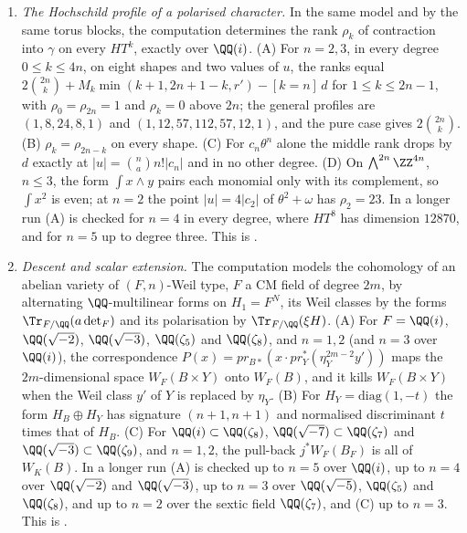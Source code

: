 \begin{enumerate}[label=\textup{(\Roman*)},leftmargin=*]
\item \emph{The Hochschild profile of a polarised character.} In the same
  model and by the same torus blocks, the computation determines the rank
  $\rho_{k}$ of contraction into $\gamma$ on every $HT^{k}$, exactly over
  $\QQ(i)$. (A) For $n=2,3$, in every degree $0\le k\le4n$, on eight shapes and two values of $u$, the ranks equal
  $2\binom{2n}{k}+M_{k}\min(k+1,2n+1-k,r')-[k=n]\,d$ for $1\le k\le2n-1$, with
  $\rho_{0}=\rho_{2n}=1$ and $\rho_{k}=0$ above $2n$; the general profiles are
  $(1,8,24,8,1)$ and $(1,12,57,112,57,12,1)$, and the pure case gives
  $2\binom{2n}{k}$. (B) $\rho_{k}=\rho_{2n-k}$ on every shape. (C) For
  $c_{n}\theta^{n}$ alone the middle rank drops by $d$ exactly at
  $|u|=\binom{n}{a}n!|c_{n}|$ and in no other degree. (D) On
  $\bigwedge^{2n}\ZZ^{4n}$, $n\le3$, the form $\int x\wedge y$ pairs each
  monomial only with its complement, so $\int x^{2}$ is even; at $n=2$ the
  point $|u|=4|c_{2}|$ of $\theta^{2}+\omega$ has $\rho_{2}=23$. In a longer
  run (A) is checked for $n=4$ in every degree, where $HT^{8}$ has
  dimension $12870$, and for $n=5$ up to degree three. This is
  .

\item \emph{Descent and scalar extension.} The computation models the
  cohomology of an abelian variety of $(F,n)$-Weil type, $F$ a CM field of
  degree $2m$, by alternating $\QQ$-multilinear forms on $H_{1}=F^{N}$, its
  Weil classes by the forms $\Tr_{F/\QQ}(a\det_{F})$ and its
  polarisation by $\Tr_{F/\QQ}(\xi H)$. (A) For $F=\QQ(i)$, $\QQ(\sqrt{-2})$,
  $\QQ(\sqrt{-3})$, $\QQ(\zeta_{5})$ and $\QQ(\zeta_{8})$, and $n=1,2$ (and
  $n=3$ over $\QQ(i)$), the correspondence
  $P(x)=pr_{B*}(x\cdot pr_{Y}^{*}(\eta_{Y}^{2m-2}y'))$ maps the $2m$-dimensional
  space $W_{F}(B\times Y)$ onto $W_{F}(B)$, and it kills $W_{F}(B\times Y)$
  when the Weil class $y'$ of $Y$ is replaced by $\eta_{Y}$. (B) For
  $H_{Y}=\mathrm{diag}(1,-t)$ the form $H_{B}\oplus H_{Y}$ has signature
  $(n+1,n+1)$ and normalised discriminant $t$ times that of $H_{B}$. (C) For
  $\QQ(i)\subset\QQ(\zeta_{8})$, $\QQ(\sqrt{-7})\subset\QQ(\zeta_{7})$ and
  $\QQ(\sqrt{-3})\subset\QQ(\zeta_{9})$, and $n=1,2$, the pull-back
  $j^{*}W_{F}(B_{F})$ is all of $W_{K}(B)$. In a longer run (A) is checked up
  to $n=5$ over $\QQ(i)$, up to $n=4$ over $\QQ(\sqrt{-2})$ and
  $\QQ(\sqrt{-3})$, up to $n=3$ over $\QQ(\sqrt{-5})$, $\QQ(\zeta_{5})$ and
  $\QQ(\zeta_{8})$, and up to $n=2$ over the sextic field $\QQ(\zeta_{7})$, and
  (C) up to $n=3$. This is .


\end{enumerate}
